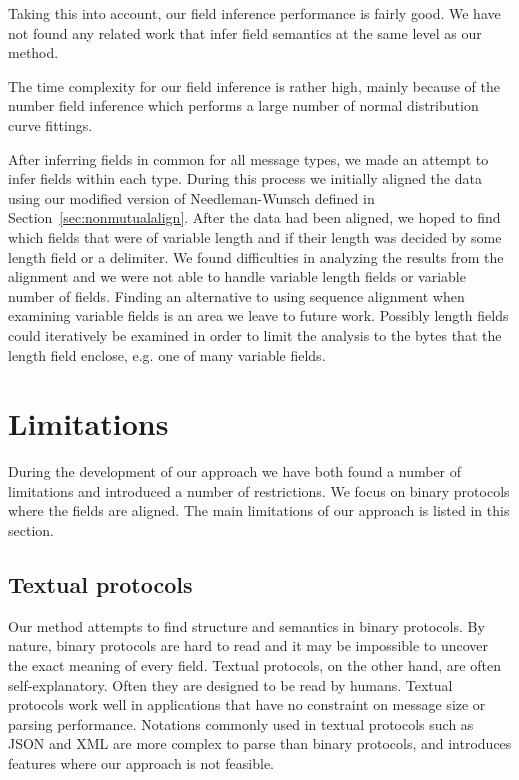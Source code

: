 \documentclass[a4paper]{report}
\begin{document}
Taking this into account, our field inference performance is fairly good.
We have not found any related work that infer field semantics at the same
level as our method.

The time complexity for our field inference is rather high, mainly because
of the number field inference which performs a large number of normal
distribution curve fittings.

After inferring fields in common for all message types, we made an
attempt to infer fields within each type. During this process we initially
aligned the data using our modified version of Needleman-Wunsch defined in
Section~\ref{sec:nonmutualalign}. After the data had been aligned, we hoped to
find which fields that were of variable length and if their length was
decided by some length field or a delimiter. We found difficulties in
analyzing the results from the alignment and we were not able to handle
variable length fields or variable number of fields. Finding an alternative
to using sequence alignment when examining variable fields is an area we
leave to future work. Possibly length fields could iteratively be examined
in order to limit the analysis to the bytes that the length field enclose,
e.g. one of many variable fields.

\section{Limitations}
During the development of our approach we have both found a number of
limitations and introduced a number of restrictions. We focus on binary
protocols where the fields are aligned. The main limitations of our approach
is listed in this section.

\subsection{Textual protocols}
Our method attempts to find structure and semantics in binary protocols.
By nature, binary protocols are hard to read and it may be impossible to
uncover the exact meaning of every field. Textual protocols, on the other
hand, are often self-explanatory. Often they are designed to be read by
humans. Textual protocols work well in applications that have no constraint
on message size or parsing performance. Notations commonly used in textual
protocols such as JSON and XML are more complex to parse than binary protocols,
and introduces features where our approach is not feasible.
\end{document}
